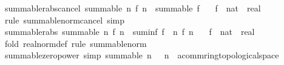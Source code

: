 \begin{isabellebody}
\endisatagproof
{\isafoldproof}%
%
\isadelimproof
\isanewline
%
\endisadelimproof
\isanewline
{}\isamarkupfalse%
\ summable{\isacharunderscore}{\kern0pt}rabs{\isacharunderscore}{\kern0pt}cancel{\isacharcolon}{\kern0pt}\ {\isachardoublequoteopen}summable\ {\isacharparenleft}{\kern0pt}{\isasymlambda}n{\isachardot}{\kern0pt}\ {\isasymbar}f\ n{\isasymbar}{\isacharparenright}{\kern0pt}\ {\isasymLongrightarrow}\ summable\ f{\isachardoublequoteclose}\isanewline
\ \ \ f\ {\isacharcolon}{\kern0pt}{\isacharcolon}{\kern0pt}\ {\isachardoublequoteopen}nat\ {\isasymRightarrow}\ real{\isachardoublequoteclose}\isanewline
%
\isadelimproof
\ \ %
\endisadelimproof
%
\isatagproof
{}\isamarkupfalse%
\ {\isacharparenleft}{\kern0pt}rule\ summable{\isacharunderscore}{\kern0pt}norm{\isacharunderscore}{\kern0pt}cancel{\isacharparenright}{\kern0pt}\ simp%
\endisatagproof
{\isafoldproof}%
%
\isadelimproof
\isanewline
%
\endisadelimproof
\isanewline
{}\isamarkupfalse%
\ summable{\isacharunderscore}{\kern0pt}rabs{\isacharcolon}{\kern0pt}\ {\isachardoublequoteopen}summable\ {\isacharparenleft}{\kern0pt}{\isasymlambda}n{\isachardot}{\kern0pt}\ {\isasymbar}f\ n{\isasymbar}{\isacharparenright}{\kern0pt}\ {\isasymLongrightarrow}\ {\isasymbar}suminf\ f{\isasymbar}\ {\isasymle}\ {\isacharparenleft}{\kern0pt}{\isasymSum}n{\isachardot}{\kern0pt}\ {\isasymbar}f\ n{\isasymbar}{\isacharparenright}{\kern0pt}{\isachardoublequoteclose}\isanewline
\ \ \ f\ {\isacharcolon}{\kern0pt}{\isacharcolon}{\kern0pt}\ {\isachardoublequoteopen}nat\ {\isasymRightarrow}\ real{\isachardoublequoteclose}\isanewline
%
\isadelimproof
\ \ %
\endisadelimproof
%
\isatagproof
{}\isamarkupfalse%
\ {\isacharparenleft}{\kern0pt}fold\ real{\isacharunderscore}{\kern0pt}norm{\isacharunderscore}{\kern0pt}def{\isacharparenright}{\kern0pt}\ {\isacharparenleft}{\kern0pt}rule\ summable{\isacharunderscore}{\kern0pt}norm{\isacharparenright}{\kern0pt}%
\endisatagproof
{\isafoldproof}%
%
\isadelimproof
\isanewline
%
\endisadelimproof
\isanewline
{}\isamarkupfalse%
\ summable{\isacharunderscore}{\kern0pt}zero{\isacharunderscore}{\kern0pt}power\ {\isacharbrackleft}{\kern0pt}simp{\isacharbrackright}{\kern0pt}{\isacharcolon}{\kern0pt}\ {\isachardoublequoteopen}summable\ {\isacharparenleft}{\kern0pt}{\isasymlambda}n{\isachardot}{\kern0pt}\ {}\ {\isacharcircum}{\kern0pt}\ n\ {\isacharcolon}{\kern0pt}{\isacharcolon}{\kern0pt}\ {\isacharprime}{\kern0pt}a{\isacharcolon}{\kern0pt}{\isacharcolon}{\kern0pt}{\isacharbraceleft}{\kern0pt}comm{\isacharunderscore}{\kern0pt}ring{\isacharunderscore}{\kern0pt}{}{\isacharcomma}{\kern0pt}topological{\isacharunderscore}{\kern0pt}space{\isacharbraceright}{\kern0pt}{\isacharparenright}{\kern0pt}{\isachardoublequoteclose}\isanewline

\end{isabellebody}
